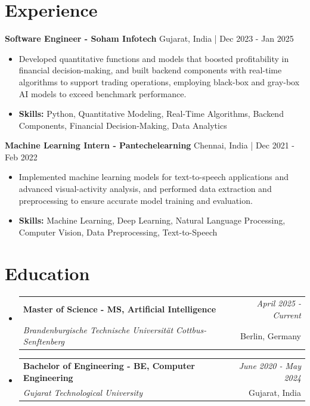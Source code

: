 \documentclass[a4paper,11pt]{article}
\makeatletter
\newcommand{\resumeSubheading}[4]{
\vspace{0.5mm}\item
    \begin{tabular*}{\linewidth}[t]{l@{\extracolsep{\fill}}r}
        \textbf{#1} & \textit{\footnotesize{#4}} \\
        \textit{\footnotesize{#3}} &  \footnotesize{#2}\\
    \end{tabular*}
    \vspace{-2.4mm}
}
\makeatother
\begin{document}
\section{\textbf{Experience}}


\vspace{1mm}
  \textbf{Software Engineer - Soham Infotech} \hfill Gujarat, India | Dec 2023 - Jan 2025
\vspace{-1.5mm} %
\begin{itemize}
  \item Developed quantitative functions and models that boosted profitability in financial decision-making, and built backend components with real-time algorithms to support trading operations, employing black-box and gray-box AI models to exceed benchmark performance.

\vspace{-2mm}
  \item \textbf{Skills:} Python, Quantitative Modeling, Real-Time Algorithms, Backend Components, Financial Decision-Making, Data Analytics
\end{itemize}

\vspace{1mm}
  \textbf{Machine Learning Intern - Pantechelearning} \hfill Chennai, India | Dec 2021 - Feb 2022
\vspace{-1.5mm} %
\begin{itemize}
  \item Implemented machine learning models for text-to-speech applications and advanced visual-activity analysis, and performed data extraction and preprocessing to ensure accurate model training and evaluation.
\vspace{-2mm}
  \item \textbf{Skills:} Machine Learning, Deep Learning, Natural Language Processing, Computer Vision, Data Preprocessing, Text-to-Speech
\end{itemize}\section{\textbf{Education}}
\vspace{-0.4mm}

\begin{itemize}[leftmargin=0.15in, label={}]
\resumeSubheading
{Master of Science - MS, Artificial Intelligence }{Berlin, Germany}
{Brandenburgische Technische Universität Cottbus-Senftenberg  }{April 2025 - Current}

\vspace{1.0mm} %
\resumeSubheading
{Bachelor of Engineering - BE, Computer Engineering  }{Gujarat, India}
{Gujarat Technological University }{June 2020 - May 2024}

\end{itemize}
\end{document}
